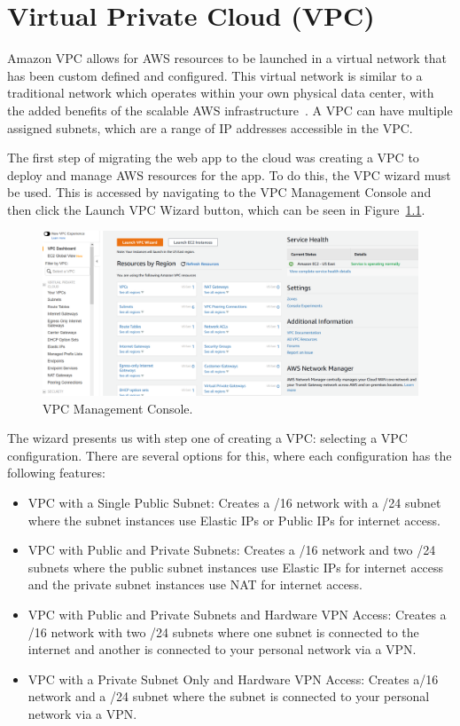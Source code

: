 \chapter{Virtual Private Cloud (VPC)}\label{ch:vpc}

Amazon VPC allows for AWS resources to be launched in a virtual network that has been custom defined and configured.
This virtual network is similar to a traditional network which operates within your own physical data center, with the
added benefits of the scalable AWS infrastructure~\parencite{amazon2022what}.
A VPC can have multiple assigned subnets, which are a range of IP addresses accessible in the VPC\@.

The first step of migrating the web app to the cloud was creating a VPC to deploy and manage AWS resources for the app.
To do this, the VPC wizard must be used.
This is accessed by navigating to the VPC Management Console and then click the Launch VPC Wizard button, which can be
seen in Figure~\ref{fig:vpc-wizard}.

\begin{figure}[!htbp]
    \centering
    \includegraphics[width=\textwidth]{resources/vpc/vpc-dashboard}
    \caption{VPC Management Console.}
    \label{fig:vpc-wizard}
\end{figure}

The wizard presents us with step one of creating a VPC: selecting a VPC configuration.
There are several options for this, where each configuration has the following features:

\begin{itemize}
    \item VPC with a Single Public Subnet: Creates a /16 network with a /24 subnet where the subnet instances use
    Elastic IPs or Public IPs for internet access.
    \item VPC with Public and Private Subnets: Creates a /16 network and two /24 subnets where the public subnet
    instances use Elastic IPs for internet access and the private subnet instances use NAT for internet access.
    \item VPC with Public and Private Subnets and Hardware VPN Access: Creates a /16 network with two /24 subnets where
    one subnet is connected to the internet and another is connected to your personal network via a VPN\@.
    \item VPC with a Private Subnet Only and Hardware VPN Access: Creates a/16 network and a /24 subnet where the
    subnet is connected to your personal network via a VPN\@.
\end{itemize}

